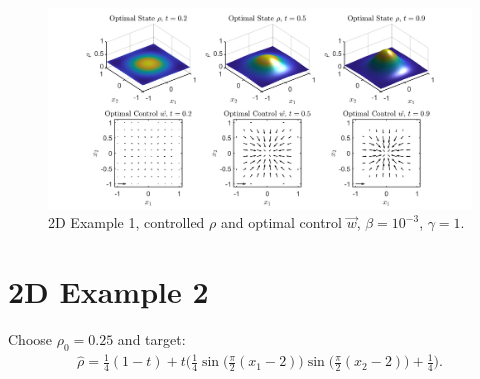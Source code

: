 \documentclass[11pt, a4paper]{article}
\theoremstyle{definition}
\begin{document}
\begin{figure}[h]
	\includegraphics[scale=0.3]{Res2b.png}
	\caption{2D Example 1, controlled $\rho$ and optimal control $\vec{w}$, $\beta = 10^{-3}$, $\gamma = 1$.}
	\label{rhoOpt2d1b}
\end{figure}

\section{2D Example 2}
Choose $\rho_0 = 0.25$ and target:
\begin{align*}
\widehat \rho = \frac{1}{4}(1-t) + t\bigg(\frac{1}{4}\sin \bigg(\frac{\pi}{2}(x_1 - 2)\bigg)\sin \bigg(\frac{\pi}{2}(x_2 - 2)\bigg) + \frac{1}{4}\bigg).
\end{align*}
\end{document}
